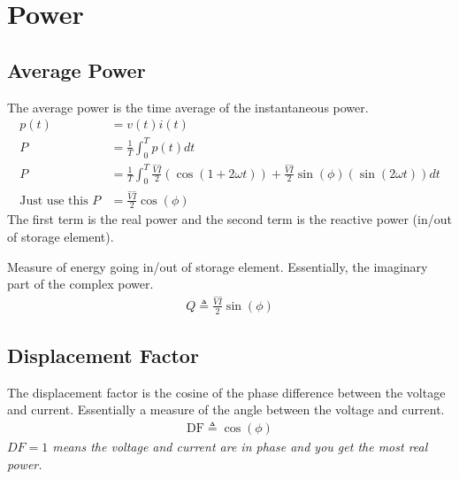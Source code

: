 \chapter{Power}

\section{Average Power}

\begin{definition}
    The average power is the time average of the instantaneous power.
    \begin{align}
        p(t) & = v(t)i(t)                                                                                                                     \\
        P    & = \frac{1}{T}\int_{0}^{T}p(t)dt                                                                                                \\
        P    & = \frac{1}{T}\int_{0}^{T}\frac{\hat{V}\hat{I}}{2}(\cos(1 + 2\omega t)) + \frac{\hat{V}\hat{I}}{2}\sin(\phi)(\sin(2\omega t))dt \\ \text{Just use this } P & = \frac{\hat{V}\hat{I}}{2}\cos(\phi)
    \end{align}
    The first term is the real power and the second term is the reactive power (in/out of storage element).
\end{definition}

\begin{definition}
    Measure of energy going in/out of storage element. Essentially, the imaginary part of the complex power.
    \begin{align}
        Q \triangleq \frac{\hat{V}\hat{I}}{2}\sin(\phi)
    \end{align}
\end{definition}

\section{Displacement Factor}
\begin{definition}
    The displacement factor is the cosine of the phase difference between the voltage and current. Essentially a measure of the angle between the voltage and current.
    \begin{align}
        \text{DF} \triangleq \cos(\phi)
    \end{align}
    \textit{$DF = 1$ means the voltage and current are in phase and you get the most real power.}
\end{definition}


